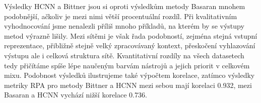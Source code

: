 Výsledky HCNN a Bittner jsou si oproti výsledkům metody Basaran mnohem podobnější, ačkoliv je mezi nimi větší procentuální rozdíl. Při kvalitativním vyhodnocování jsme nenalezli příliš mnoho příkladů, na kterém by se výstupy metod výrazně lišily. Mezi sítěmi je však řada podobností, zejména stejná vstupní reprezentace, přibližně stejně velký zpracovávaný kontext, přeskočení vyhlazování výstupu ale i celková struktura sítě. Kvantitativní rozdíly na všech datasetech tedy přičítáme spíše lépe naučeným barvám nástrojů a jejich priorit v celkovém mixu. Podobnost výsledků ilustrujeme také výpočtem korelace, zatímco výsledky metriky RPA pro metody Bittner a HCNN mezi sebou mají korelaci 0.932, mezi Basaran a HCNN vychází nižší korelace 0.736.











